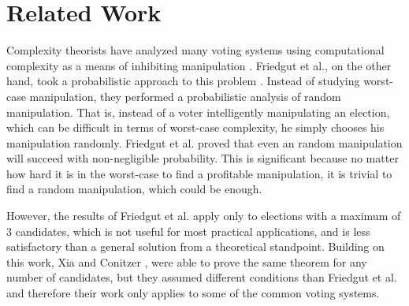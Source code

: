 
\chapter{Related Work}

	Complexity theorists have analyzed many voting systems using computational complexity as a means of inhibiting manipulation \cite{bartholdi1989computational, hemaspaandra2009hybrid}. Friedgut et al., on the other hand, took a probabilistic approach to this problem \cite{friedgut2008elections}. Instead of studying worst-case manipulation, they performed a probabilistic analysis of random manipulation. That is, instead of a voter intelligently manipulating an election, which can be difficult in terms of worst-case complexity, he simply chooses his manipulation randomly. Friedgut et al. \cite{friedgut2008elections} proved that even an random manipulation will succeed with non-negligible probability. This is significant because no matter how hard it is in the worst-case to find a profitable manipulation, it is trivial to find a random manipulation, which could be enough.

	However, the results of Friedgut et al. \cite{friedgut2008elections} apply only to elections with a maximum of 3 candidates, which is not useful for most practical applications, and is less satisfactory than a general solution from a theoretical standpoint. Building on this work, Xia and Conitzer \cite{xia2008sufficient}, were able to prove the same theorem for any number of candidates, but they assumed different conditions than Friedgut et al. and therefore their work only applies to some of the common voting systems.
